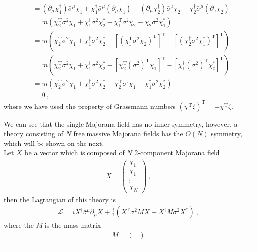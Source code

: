 \documentclass[12pt]{report}
\numberwithin{problemname}{chapter}
\newenvironment{solution}{\vspace{1em}\par\noindent{\large\textbf{\textsc{Solution}}}\par}{\vspace{1em}\hrule}
\begin{document}
\begin{solution}
\begin{enumerate}[(a)]
\begin{align}
        &=(\partial_{\mu}\chi_1^{\dagger})\bar{\sigma}^{\mu}\chi_1+\chi_1^{\dagger}\bar{\sigma}^{\mu}(\partial_{\mu}\chi_1)-(\partial_{\mu}\chi_2^{\dagger})\bar{\sigma}^{\mu}\chi_2-\chi_2^{\dagger}\bar{\sigma}^{\mu}(\partial_{\mu}\chi_2) \nonumber \\
        &=m(\chi_2^{\text{T}}\sigma^2\chi_1+\chi_1^{\dagger}\sigma^2\chi_2^*-\chi_1^{\text{T}}\sigma^2\chi_2-\chi_2^{\dagger}\sigma^2\chi_1^*) \nonumber \\
        &=m(\chi_2^{\text{T}}\sigma^2\chi_1+\chi_1^{\dagger}\sigma^2\chi_2^*-[(\chi_1^{\text{T}}\sigma^2\chi_2)^{\text{T}}]^{\text{T}}-[(\chi_2^{\dagger}\sigma^2\chi_1^*)^{\text{T}}]^{\text{T}}) \nonumber \\
        &=m(\chi_2^{\text{T}}\sigma^2\chi_1+\chi_1^{\dagger}\sigma^2\chi_2^*-[\chi_2^{\text{T}}(\sigma^2)^{\text{T}}\chi_1]^{\text{T}}-[\chi_1^{\dagger}(\sigma^2)^{\text{T}}\chi_2^*]^{\text{T}}) \nonumber \\
        &=m(\chi_2^{\text{T}}\sigma^2\chi_1+\chi_1^{\dagger}\sigma^2\chi_2^*-\chi_2^{\text{T}}\sigma^2\chi_1-\chi_1^{\dagger}\sigma^2\chi_2^*) \nonumber \\
        &=0\ ,
    \end{align}
    where we have used the property of Grassmann numbers $(\chi^{\text{T}}\zeta)^{\text{T}}=-\chi^{\text{T}}\zeta$. \par
    We can see that the single Majorana field has no inner symmetry, however, a theory consisting of $N$ free massive Majorana fields has the $O(N)$ symmetry, which will be shown on the next. \\
    Let $X$ be a vector which is composed of $N$ 2-component Majorana field
    \begin{align}
        X=\begin{pmatrix}
          \chi_1 \\
          \chi_1 \\
          \vdots \\
          \chi_N
        \end{pmatrix}\ ,
    \end{align}
    then the Lagrangian of this theory is
    \begin{align}
        \mathcal{L}=iX^{\dagger}\bar{\sigma}^{\mu}\partial_{\mu}X+\frac{i}{2}(X^{\text{T}}\sigma^2MX-X^{\dagger}M\sigma^2 X^*)\ ,
    \end{align}
    where the $M$ is the mass matrix
    \begin{align}
        M=\begin{pmatrix}

\end{pmatrix}
\end{align}
\end{enumerate}
\end{solution}
\end{document}
